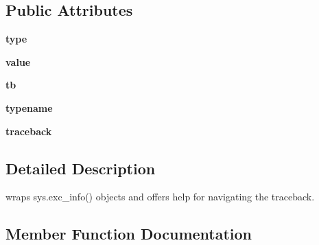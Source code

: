 \subsection*{Public Attributes}
\begin{DoxyCompactItemize}
\item 
\mbox{\label{class__pytest_1_1__code_1_1code_1_1_exception_info_aac52e13e3b15c04b1af062b8a322654e}} 
{\bfseries type}
\item 
\mbox{\label{class__pytest_1_1__code_1_1code_1_1_exception_info_a41eb8b117a5d52da357c593bb96006fe}} 
{\bfseries value}
\item 
\mbox{\label{class__pytest_1_1__code_1_1code_1_1_exception_info_a4a3d5ddc9e198f0283d0766f14a94b90}} 
{\bfseries tb}
\item 
\mbox{\label{class__pytest_1_1__code_1_1code_1_1_exception_info_ae2ccd1d02998c461fc2f34c1b26fdc84}} 
{\bfseries typename}
\item 
\mbox{\label{class__pytest_1_1__code_1_1code_1_1_exception_info_aa8b5fa4eb59eae298e7b48d40a6bddde}} 
{\bfseries traceback}
\end{DoxyCompactItemize}


\subsection{Detailed Description}
\begin{DoxyVerb}wraps sys.exc_info() objects and offers
    help for navigating the traceback.
\end{DoxyVerb}
 

\subsection{Member Function Documentation}
\mbox{\label{class__pytest_1_1__code_1_1code_1_1_exception_info_ad860848bfec5f4a146816240745e0ae5}} 
